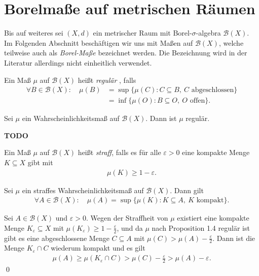 \section{Borelmaße auf metrischen Räumen}

Bis auf weiteres sei $(X,d)$ ein metrischer Raum mit Borel-$\sigma$-algebra $\mathcal{B}(X)$. 
Im Folgenden Abschnitt beschäftigen wir uns mit Maßen auf $\mathcal{B}(X)$, welche teilweise auch als \textit{Borel-Maße} bezeichnet werden. 
Die Bezeichnung wird in der Literatur allerdings nicht einheitlich verwendet. 

\begin{mydef}
    Ein Maß $\mu$ auf $\mathcal{B}(X)$ heißt \textit{regulär} , falls
    \begin{align*}
        \forall B \in \mathcal{B}(X): \quad \mu(B) &= \sup\{\mu(C): C \subseteq B, \ C \text{ abgeschlossen} \} \\\
                                                   &= \inf\{\mu(O): B \subseteq O, \ O \text{ offen} \}.  
    \end{align*}  
\end{mydef}

\begin{proposition}
    Sei $\mu$ ein Wahrscheinlichkeitsmaß auf $\mathcal{B}(X)$. Dann ist $\mu$ regulär. 
\end{proposition}

\begin{proof*}
    \textbf{TODO}
\end{proof*}

\begin{mydef}
    Ein Maß $\mu$ auf $\mathcal{B}(X)$ heißt \textit{straff}, falls es für alle $\varepsilon > 0$ eine kompakte Menge $K \subseteq X$ gibt mit 
    \begin{align*}
        \mu(K) \geq 1 - \varepsilon. 
    \end{align*}

\end{mydef}

\begin{corollary}
    Sei $\mu$ ein straffes Wahrscheinlichkeitsmaß auf $\mathcal{B}(X)$. Dann gilt
    \begin{align*}
        \forall A \in \mathcal{B}(X): \quad \mu(A) = \sup\{\mu(K): K \subseteq A,\ K \text{ kompakt}\}. 
    \end{align*}
\end{corollary}

\begin{proof*}
    Sei $A \in \mathcal{B}(X)$ und $\varepsilon > 0$. Wegen der Straffheit von $\mu$ existiert eine kompakte Menge $K_{\varepsilon} \subseteq X$ mit $\mu(K_{\varepsilon}) \geq 1 - \frac{\varepsilon}{2}$,
    und da $\mu$ nach Proposition 1.4 regulär ist gibt es eine abgeschlossene Menge $C \subseteq A$ mit $\mu(C) > \mu(A) - \frac{\varepsilon}{2}$. Dann ist die Menge $K_{\varepsilon} \cap C$ wiederum kompakt und es gilt
    \begin{align*}
        \mu(A) \geq \mu(K_{\varepsilon} \cap C) > \mu(C) - \frac{\varepsilon}{2} > \mu(A) - \varepsilon. 
    \end{align*} 
    \qed
\end{proof*}

